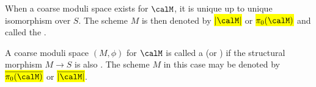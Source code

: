 \begin{definition}
    When a coarse moduli space exists for $\calM$, it is unique up to unique isomorphism over $S$. The scheme $M$ is then denoted by \hl{$|\calM|$} or \hl{$\pi_0(\calM)$} and called the .

    A coarse moduli space $(M, \phi)$ for $\calM$ is called a  (or ) if the structural morphism $M \to S$ is also . The scheme $M$ in this case may be denoted by \hl{$\overline{\pi_0(\calM)}$} or \hl{$\overline{|\calM|}$}.
\end{definition}

